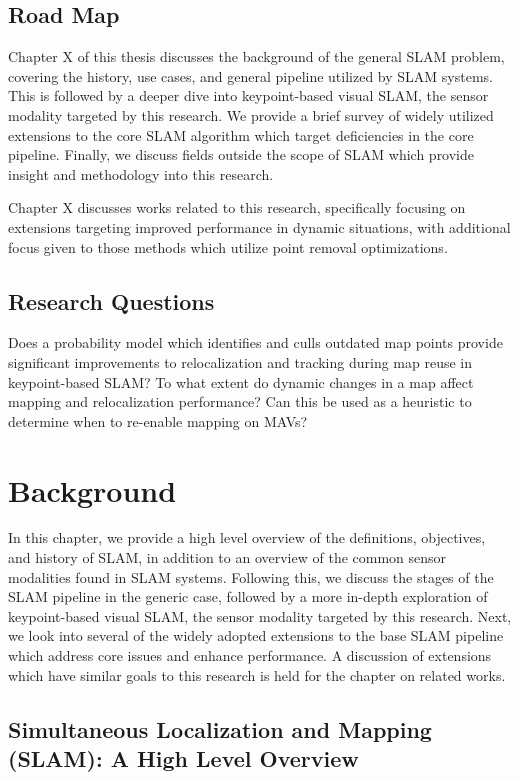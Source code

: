 \documentclass[12pt]{article}
\begin{document}
\subsection{Road Map}

Chapter X of this thesis discusses the background of the general SLAM problem, covering the history, use cases, and general pipeline utilized by SLAM systems. This is followed by a deeper dive into keypoint-based visual SLAM, the sensor modality targeted by this research. We provide a brief survey of widely utilized extensions to the core SLAM algorithm which target deficiencies in the core pipeline. Finally, we discuss fields outside the scope of SLAM which provide insight and methodology into this research.

Chapter X discusses works related to this research, specifically focusing on extensions targeting improved performance in dynamic situations, with additional focus given to those methods which utilize point removal optimizations.

\subsection{Research Questions}

Does a probability model which identifies and culls outdated map points provide significant improvements to relocalization and tracking during map reuse in keypoint-based SLAM?
To what extent do dynamic changes in a map affect mapping and relocalization performance?
Can this be used as a heuristic to determine when to re-enable mapping on MAVs?

\section{Background}

In this chapter, we provide a high level overview of the definitions, objectives, and history of SLAM, in addition to an overview of the common sensor modalities found in SLAM systems. Following this, we discuss the stages of the SLAM pipeline in the generic case, followed by a more in-depth exploration of keypoint-based visual SLAM, the sensor modality targeted by this research. Next, we look into several of the widely adopted extensions to the base SLAM pipeline which address core issues and enhance performance. A discussion of extensions which have similar goals to this research is held for the chapter on related works.

\subsection{Simultaneous Localization and Mapping (SLAM): A High Level Overview}
\end{document}
